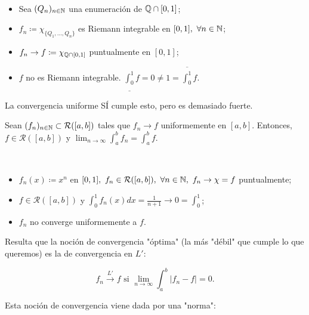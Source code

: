 	\begin{eg}[2]~
		\begin{itemize}
			\item Sea $(Q_n)_{n \in \mathbb{N}}$ una enumeración de $\mathbb{Q} \cap [0,1]$;

			\item $f_n \coloneq \chi_{\{ Q_1,\dots,Q_n \}}$ es Riemann integrable en $[0,1],\ \forall n \in \mathbb{N}$;

			\item $f_n \to f \coloneq \chi_{\mathbb{Q} \cap [0,1]}$ puntualmente en $[0,1]$;

			\item $f$ no es Riemann integrable. $\underline{\int_{0}^{1}} f = 0 \neq 1 = \overline{\int_{0}^{1}} f$.
		\end{itemize}
	\end{eg}

	\begin{remark}
		La convergencia uniforme SÍ cumple esto, pero es demasiado fuerte.
	\end{remark}

	\begin{ex}[Guía 1]
		Sean $(f_n)_{n \in \mathbb{N}} \subset \mathcal{R}([a,b])$ tales que $f_n \to f$ uniformemente en $[a,b]$. Entonces, $f \in \mathcal{R}([a,b])$ y $\lim_{n \to \infty} \int_{a}^{b} f_n = \int_{a}^{b} f$.
	\end{ex}

	\begin{eg}[3]~
		\begin{itemize}
			\item $f_n (x) \coloneq x^n$ en $[0,1],\ f_n \in \mathcal{R}([a,b]),\ \forall n \in \N,\ f_n \to \chi = f$ puntualmente;

			\item $f \in \mathcal{R}([a,b])$ y $\int_{0}^{1} f_n (x) dx = \frac{1}{n+1} \to 0 = \int_{0}^{1}$;

			\item $f_n$ no converge uniformemente a $f$.
		\end{itemize}
	\end{eg}

	Resulta que la noción de convergencia "óptima" (la más "débil" que cumple lo que queremos) es la de convergencia en $L'$:

	\[
	f_n \xrightarrow{L'} f \text{ si } \lim_{n \to \infty} \int_{a}^{b} | f_n - f | = 0.
	\]

	Esta noción de convergencia viene dada por una "norma":

